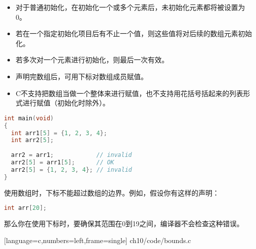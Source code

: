 \begin{frame}[fragile]
\begin{itemize}
\item 
对于普通初始化，在初始化一个或多个元素后，未初始化元素都将被设置为0。\\[0.1in]
\item 
若在一个指定初始化项目后有不止一个值，则这些值将对后续的数组元素初始化。\\[0.1in]
\item
若多次对一个元素进行初始化，则最后一次有效。
\end{itemize}

\end{frame}

\begin{frame}[fragile]
\begin{itemize}
\item 
声明完数组后，可用下标对数组成员赋值。\\[0.1in]
\item
C不支持把数组当做一个整体来进行赋值，也不支持用花括号括起来的列表形式进行赋值（初始化时除外）。
\end{itemize}
\end{frame}

\begin{frame}[fragile]
\begin{lstlisting}[language=c,backgroundcolor=\color{red!20}]
int main(void)
{
  int arr1[5] = {1, 2, 3, 4};
  int arr2[5];
  
  arr2 = arr1;            // invalid
  arr2[5] = arr1[5];      // OK
  arr2[5] = {1, 2, 3, 4}; // invalid
}
\end{lstlisting}
\end{frame}

\begin{frame}[fragile]
使用数组时，下标不能超过数组的边界。例如，假设你有这样的声明：
\begin{lstlisting}[language=c,backgroundcolor=\color{red!20}]
int arr[20];
\end{lstlisting}
那么你在使用下标时，要确保其范围在0到19之间，编译器不会检查这种错误。
\end{frame}

\begin{frame}

[language=c,numbers=left,frame=single]
{ch10/code/bounds.c}
\end{frame}

